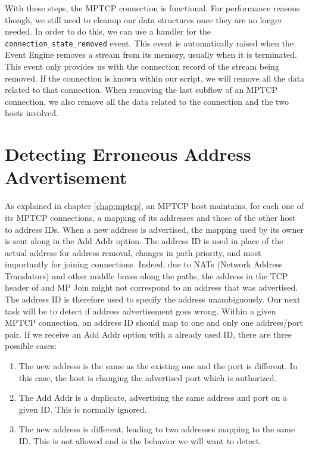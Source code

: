 With these steps, the MPTCP connection is functional. For performance reasons though, we still need to cleanup our data structures once they are no longer needed. In order to do this, we can use a handler for the \texttt{connection\_state\_removed} event. This event is automatically raised when the Event Engine removes a stream from its memory, usually when it is terminated. This event only provides us with the connection record of the stream being removed. If the connection is known within our script, we will remove all the data related to that connection. When removing the last subflow of an MPTCP connection, we also remove all the data related to the connection and the two hosts involved.


\section{Detecting Erroneous Address Advertisement} \label{section:add addr log}
As explained in chapter \ref{chap:mptcp}, an MPTCP host maintains, for each one of its MPTCP connections, a mapping of its addresses and those of the other host to address IDs. When a new address is advertised, the mapping used by its owner is sent along in the Add Addr option. The address ID is used in place of the actual address for address removal, changes in path priority, and most importantly for joining connections. Indeed, due to NATs (Network Address Translators) and other middle boxes along the paths, the address in the TCP header of and MP Join might not correspond to an address that was advertised. The address ID is therefore used to specify the address unambiguously. Our next task will be to detect if address advertisement goes wrong. Within a given MPTCP connection, an address ID should map to one and only one address/port pair. If we receive an Add Addr option with a already used ID, there are three possible cases: \\

\begin{enumerate}
\item The new address is the same as the existing one and the port is different. In this case, the host is changing the advertised port which is authorized.
\item The Add Addr is a duplicate, advertising the same address and port on a given ID. This is normally ignored.
\item The new address is different, leading to two addresses mapping to the same ID. This is not allowed and is the behavior we will want to detect.
\end{enumerate} 

